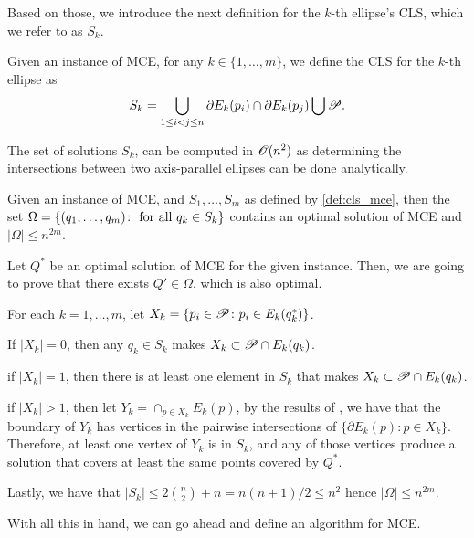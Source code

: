 Based on those, we introduce the next definition for the $k$-th ellipse's CLS, which we refer to as $S_k$.

\begin{definition}\label{def:cls_mce}
	Given an instance of MCE, for any $k \in \{1, \dots, m\}$, we define the CLS for the $k$-th ellipse as
	\begin{equation}
	S_k = \bigcup_{1 \le i < j \le n} \partial E_k(p_i) \cap \partial E_k(p_j) \bigcup \mathscr{P}.
	\end{equation}
\end{definition}

The set of solutions $S_k$, can be computed in $\mathscr{O}(n^2)$ as determining the intersections between two axis-parallel ellipses can be done analytically. 

\begin{lem}
	Given an instance of MCE, and $S_1, \dots, S_m$ as defined by \autoref{def:cls_mce}, then the set $\Omega = \{(q_1, \dots, q_m) \colon \textnormal{ for all }q_k \in S_k \}$ contains an optimal solution of MCE and $|\Omega| \le n^{2m}$. 
\end{lem}
\begin{pf}
	Let $Q^*$ be an optimal solution of MCE for the given instance. Then, we are going to prove that there exists $Q' \in \Omega$, which is also optimal.
	
	For each $k=1, \dots, m$, let $X_k = \{p_i \in \mathscr{P}\colon p_i \in E_k(q_k^*)\}$.
	
	If $|X_k| = 0$, then any $q_k \in S_k$ makes $X_k \subset \mathscr{P} \cap E_k(q_k)$.
	
	if $|X_k| = 1$, then there is at least one element in $S_k$ that makes $X_k \subset \mathscr{P} \cap E_k(q_k)$.
	
	if $|X_k| > 1$, then let $Y_k = \cap_{p \in X_k}E_k(p)$, by the results of \cite{bi}, we have that the boundary of $Y_k$ has vertices in the pairwise intersections of $\{\partial E_k(p) \colon p \in X_k\}$. Therefore, at least one vertex of $Y_k$ is in $S_k$, and any of those vertices produce a solution that covers at least the same points covered by $Q^*$.
	
	Lastly, we have that $|S_k| \le 2\binom{n}{2} + n = n(n+1)/2 \le n^2$ hence $|\Omega| \le n^{2m}$.
\end{pf}

With all this in hand, we can go ahead and define an algorithm for MCE.

